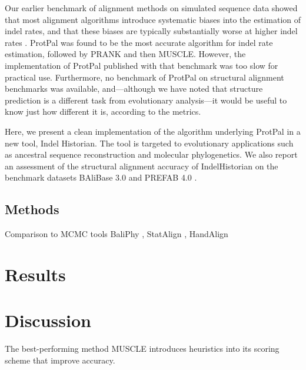\documentclass{bioinfo}
\begin{document}
Our earlier benchmark of alignment methods on simulated sequence data
showed that most alignment algorithms introduce systematic biases into the
estimation of indel rates, and that these biases are typically substantially worse
at higher indel rates \citep{Westesson2012-zg}.
ProtPal was found to be the most accurate algorithm for indel rate estimation,
followed by PRANK and then MUSCLE.
However, the implementation of ProtPal published with that benchmark was too slow
for practical use.
Furthermore, no benchmark of ProtPal on structural alignment benchmarks was available,
and---although we have noted that structure prediction is a different task from evolutionary analysis---it would be
useful to know just how different it is, according to the metrics.

Here, we present a clean implementation of the algorithm underlying ProtPal
in a new tool, Indel Historian.
The tool is targeted to evolutionary applications such
as ancestral sequence reconstruction and molecular phylogenetics.
We also report an assessment of the structural alignment accuracy of IndelHistorian on the benchmark datasets BAliBase 3.0 \citep{ThompsonEtAl2005}
and PREFAB 4.0 \citep{Edgar2010}.

\begin{methods}
\section{Methods}

\citep{Westesson2012-zg}

\end{methods}



Comparison to MCMC tools
BaliPhy \citep{RedelingsSuchard2005,RedelingsSuchard2007,Redelings2014},
StatAlign \citep{NovakEtAl2008,HermanEtAl2014},
HandAlign \citep{WestessonBarquistHolmes2012}


\section{Results}



\section{Discussion}



The best-performing method MUSCLE introduces heuristics into its scoring scheme
that improve accuracy.
\end{document}
